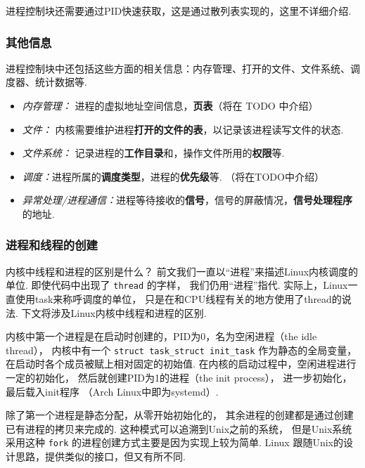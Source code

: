 进程控制块还需要通过PID快速获取，这是通过散列表实现的，这里不详细介绍.

\subsubsection{其他信息}
进程控制块中还包括这些方面的相关信息：内存管理、打开的文件、文件系统、调度器、统计数据等.

\begin{itemize}
	\item\textit{内存管理：} 进程的虚拟地址空间信息，\textbf{页表}（将在 TODO 中介绍）
	\item \textit{文件：} 内核需要维护进程\textbf{打开的文件的表}，以记录该进程读写文件的状态.
	\item \textit{文件系统：} 记录进程的\textbf{工作目录}和，操作文件所用的\textbf{权限}等.
	\item \textit{调度：}进程所属的\textbf{调度类型}，进程的\textbf{优先级}等. （将在TODO中介绍）
	\item \textit{异常处理/进程通信：}进程等待接收的\textbf{信号}，信号的屏蔽情况，\textbf{信号处理程序}的地址.
\end{itemize}

\subsubsection{进程和线程的创建} \label{creating task}

\begin{qbox}{内核中线程和进程的区别是什么？}
	前文我们一直以“进程”来描述Linux内核调度的单位.
	即使代码中出现了 \lstinline{thread} 的字样，
	我们仍用“进程”指代.
	实际上，Linux一直使用task来称呼调度的单位，
	只是在和CPU线程有关的地方使用了thread的说法.
	下文将涉及Linux内核中线程和进程的区别.
\end{qbox}

内核中第一个进程是在启动时创建的，PID为0，名为空闲进程（the idle thread），
内核中有一个 \lstinline{struct task_struct init_task}
作为静态的全局变量，在启动时各个成员被赋上相对固定的初始值.
在内核的启动过程中，空闲进程进行一定的初始化，
然后就创建PID为1的进程（the init process），
进一步初始化，最后载入init程序\cite{bovet2005understanding}
（Arch Linux中即为systemd）.

除了第一个进程是静态分配，从零开始初始化的，
其余进程的创建都是通过创建已有进程的拷贝来完成的.
这种模式可以追溯到Unix之前的系统，
但是Unix系统采用这种 \lstinline{fork} 的进程创建方式主要是因为实现上较为简单.\cite{ritchie1979evolution}
Linux 跟随Unix的设计思路，提供类似的接口，但又有所不同.

